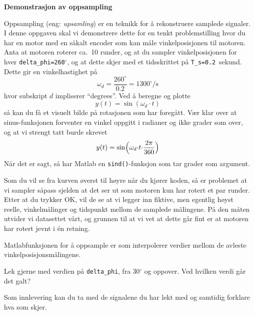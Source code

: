 
\item   {\bf Demonstrasjon av oppsampling}

  Oppsampling  (eng: {\it upsamling}) er en teknikk for å rekonstruere
  samplede signaler.   I denne
  oppgaven skal vi demonstrere dette for en tenkt problemstilling hvor
  du har en motor med en såkalt encoder som kan måle vinkelposisjonen
  til motoren. Anta
  at motoren roterer ca.\ 10 runder, og at du sampler
  vinkelposisjonen for hver {\tt delta\_phi=260}$^{\circ}$, og at
  dette skjer med et 
  tidsskrittet på {\tt T\_s=0.2}~sekund. Dette gir en vinkelhastighet på
  \begin{equation}
\omega_{d} = \frac{260^{\circ}}{0.2}= 1300^{\circ}/\text{s}    
\end{equation}
hvor subskript $d$ impliserer ``degrees''. 
Ved å beregne og plotte
  \begin{equation}
y(t) = \sin(\omega_{d}{\cdot} t)    
  \end{equation}
så kan du  få et visuelt bilde på rotasjonen som har
foregått.  Vær klar over at sinus-funksjonen forventer
en vinkel oppgitt i radianer og ikke grader som over, og at vi strengt
tatt burde skrevet
  \begin{equation}
y(t) = \sin\Bigl(\omega_{d}{\cdot} t {\cdot} \frac{2\pi}{360} \Bigl)    
  \end{equation}
Når det er sagt, så har Matlab en  {\tt sind()}-funksjon som tar
grader som argument.


Som du vil se fra kurven øverst til høyre når du kjører koden,
så er problemet at vi sampler såpass sjelden at det ser ut 
som motoren kun har rotert et par runder. Etter at du trykker OK, vil
de se at vi legger     
inn fiktive, men egentlig høyst reelle, vinkelmålinger og tidspunkt
mellom de samplede  målingene. På den måten utvider vi datasettet
vårt, og grunnen til at vi vet at dette går fint er at motoren har
rotert jevnt i én retning. 

Matlabfunksjonen for å oppsample er
 som interpolerer 
verdier mellom de avleste vinkelposisjonsmålingene.

Lek gjerne med verdien på {\tt delta\_phi}, fra 30$^{\circ}$ og
oppover. Ved hvilken verdi går det galt?

Som innlevering kan du ta med de signalene du har lekt med og samtidig
forklare hva som skjer.
